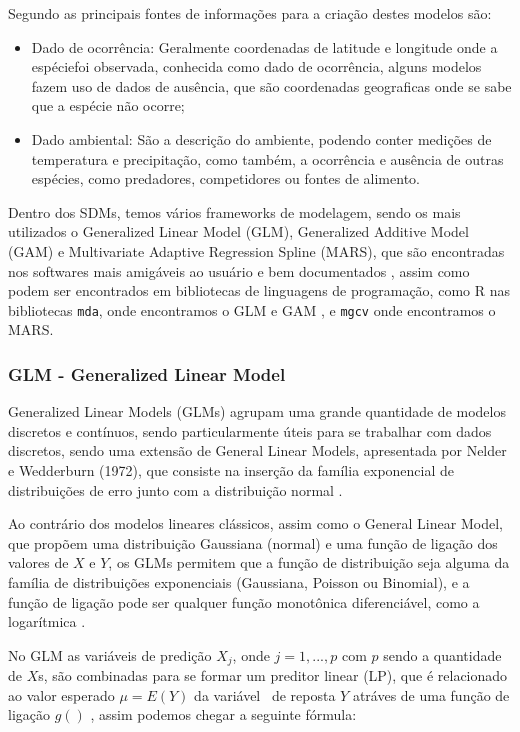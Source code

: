 \documentclass[
    12pt,               %
    openright,          %
    oneside,            %
    a4paper,            %
    english,            %
    brazil              %
    ]{abntex2}
\begin{document}
Segundo \cite{tiposDados_sdm} as principais fontes de informações para a criação destes modelos são: 
\begin{itemize}
    \item Dado de ocorrência: Geralmente coordenadas de latitude e longitude onde a espéciefoi observada, conhecida como
    dado de ocorrência, alguns modelos fazem uso de dados de ausência, que são coordenadas geograficas 
    onde se sabe que a espécie não ocorre;
    \item Dado ambiental: São a descrição do ambiente, podendo conter medições de temperatura e precipitação, como
    também, a ocorrência e ausência de outras espécies, como predadores, competidores ou fontes de alimento.
\end{itemize}

Dentro dos SDMs, temos vários frameworks de modelagem, sendo os mais utilizados o Generalized Linear Model (GLM), 
Generalized Additive Model (GAM) e Multivariate Adaptive Regression Spline (MARS), que são encontradas nos
softwares mais amigáveis ao usuário e bem documentados \cite{predPerform33models}, assim como podem ser encontrados em 
bibliotecas de linguagens de programação, como R nas bibliotecas \lstinline|mda|, onde encontramos o GLM e GAM \cite{mda},
e \lstinline|mgcv| onde encontramos o MARS\cite{mgcv}.

\subsubsection{GLM - Generalized Linear Model}

Generalized Linear Models (GLMs) agrupam uma grande quantidade de modelos discretos e contínuos, sendo particularmente úteis 
para se trabalhar com dados discretos, sendo uma extensão de General Linear Models, apresentada por Nelder e Wedderburn 
(1972), que consiste na inserção da família exponencial de distribuições de erro junto com a distribuição normal \cite{GLM}.

Ao contrário dos modelos lineares clássicos, assim como o General Linear Model, que propõem uma distribuição Gaussiana (normal) 
e uma função de ligação dos valores de $X$ e $Y$, os GLMs permitem que a função de distribuição seja alguma da família de distribuições 
exponenciais (Gaussiana, Poisson ou Binomial), e a função de ligação pode ser qualquer função monotônica 
diferenciável, como a logarítmica \cite{GAMeGLM_especie_estudo}.

No GLM as variáveis de predição $X_j$, onde $j = 1, ..., p$ com $p$ sendo a quantidade de $X$s, são combinadas para se formar um 
preditor linear (LP), que é relacionado ao valor esperado $\mu = E(Y)$ da variável  de reposta $Y$ atráves de uma função de ligação $g()$ 
\cite{GAMeGLM_especie_estudo}, assim podemos chegar a seguinte fórmula: 
\end{document}

